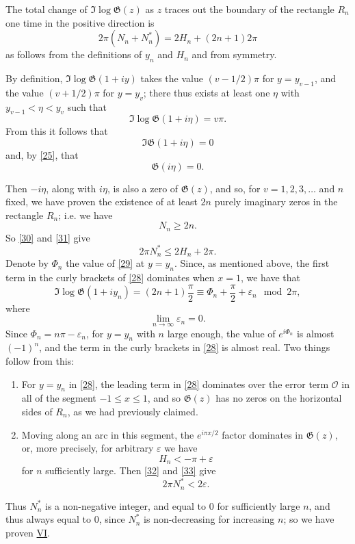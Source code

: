 \documentclass{article}
\theoremstyle{plain}
\newcommand{\GG}{\mathfrak{G}}
\newcommand{\error}{\mathcal{O}}
\newcommand{\oldpage}[1]{\marginpar{\footnotesize$\Big\vert$ \textit{p.~#1}}}
\begin{document}
\begin{enumerate}[I.]
    The total change of $\Im\log\GG(z)$ as $z$ traces out the boundary of the rectangle $R_n$ one time in the positive direction is
    \[
    \label{30}
      2\pi(N_n + N_n^*) = 2H_n + (2n+1)2\pi
    \tag{30}
    \]
    as follows from the definitions of $y_n$ and $H_n$ and from symmetry.

    By definition, $\Im\log\GG(1+iy)$ takes the value $(v-1/2)\pi$ for $y=y_{v-1}$, and the value $(v+1/2)\pi$ for $y=y_v$;
    there thus exists at least one $\eta$ with $y_{v-1}<\eta<y_v$ such that
    \[
      \Im\log\GG(1+i\eta) = v\pi.
    \]
    From this it follows that
    \[
      \Im\GG(1+i\eta) = 0
    \]
    and, by \cref{25}, that
    \[
      \GG(i\eta) = 0.
    \]

    Then $-i\eta$, along with $i\eta$, is also a zero of $\GG(z)$, and so, for $v=1,2,3,\ldots$ and $n$ fixed, we have proven the existence of at least $2n$ purely imaginary zeros in the rectangle $R_n$;
    i.e. we have
    \[
    \label{31}
      N_n \geqslant 2n.
    \tag{31}
    \]
    So \cref{30} and \cref{31} give
    \[
    \label{32}
      2\pi N_n^* \leqslant 2H_n + 2\pi.
    \tag{32}
    \]
    Denote by $\Phi_n$ the value of \cref{29} at $y=y_n$.
    Since, as mentioned above, the first term in the curly brackets of \cref{28} dominates when $x=1$, we have that
    \[
      \Im\log\GG(1+iy_n)
      = (2n+1)\frac\pi2
      \equiv \Phi_n + \frac\pi2 + \varepsilon_n \mod2\pi,
    \]
    where
    \[
      \lim_{n\to\infty}\varepsilon_n = 0.
    \]
\oldpage{315}
    Since $\Phi_n=n\pi-\varepsilon_n$, for $y=y_n$ with $n$ large enough, the value of $e^{i\Phi_n}$ is almost $(-1)^n$, and the term in the curly brackets in \cref{28} is almost real.
    Two things follow from this:
    \begin{enumerate}[1)]
      \item For $y=y_n$ in \cref{28}, the leading term in \cref{28} dominates over the error term $\error$ in all of the segment $-1\leqslant x\leqslant 1$, and so $\GG(z)$ has no zeros on the horizontal sides of $R_n$, as we had previously claimed.
      \item Moving along an arc in this segment, the $e^{i\pi x/2}$ factor dominates in $\GG(z)$, or, more precisely, for arbitrary $\varepsilon$ we have
        \[
        \label{33}
          H_n < -\pi + \varepsilon
        \tag{33}
        \]
        for $n$ sufficiently large.
        Then \cref{32} and \cref{33} give
        \[
          2\pi N_n^* < 2\varepsilon.
        \]
    \end{enumerate}
    Thus $N_n^*$ is a non-negative integer, and equal to $0$ for sufficiently large $n$, and thus always equal to $0$, since $N_n^*$ is non-decreasing for increasing $n$;
    so we have proven \hyperref[VI]{VI}.
\end{enumerate}
\end{document}
